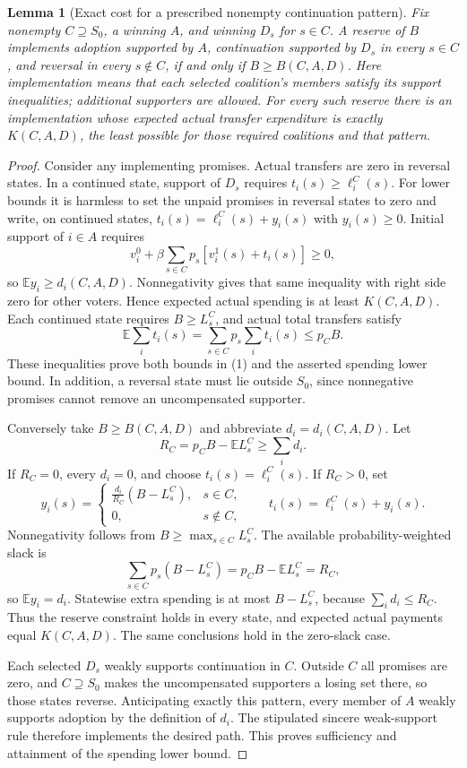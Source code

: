 \documentclass[11pt]{article}
\newtheorem{lemma}{Lemma}
\theoremstyle{definition}
\begin{document}
\begin{lemma}[Exact cost for a prescribed nonempty continuation pattern]
Fix nonempty $C\supseteq S_0$, a winning $A$, and winning $D_s$ for
$s\in C$. A reserve of $B$ implements adoption supported by $A$,
continuation supported by $D_s$ in every $s\in C$, and reversal in
every $s\notin C$, if and only if $B\geq B(C,A,D)$.
Here implementation means that each selected coalition's members
satisfy its support inequalities; additional supporters are allowed.
For every such reserve there is an implementation whose expected
actual transfer expenditure is exactly $K(C,A,D)$, the least possible
for those required coalitions and that pattern.
\end{lemma}
\begin{proof}
Consider any implementing promises. Actual transfers are zero in
reversal states. In a continued state, support of $D_s$ requires
$t_i(s)\geq\ell_i^C(s)$. For lower bounds it is harmless to set the
unpaid promises in reversal states to zero and write, on continued
states, $t_i(s)=\ell_i^C(s)+y_i(s)$ with $y_i(s)\geq0$.
Initial support of $i\in A$ requires
\[
 v_i^0+\beta\sum_{s\in C}p_s[v_i^1(s)+t_i(s)]\geq0,
\]
so $\mathbb E y_i\geq d_i(C,A,D)$. Nonnegativity gives that same
inequality with right side zero for other voters. Hence expected
actual spending is at least $K(C,A,D)$. Each continued state requires
$B\geq L_s^C$, and actual total transfers satisfy
\[
 \mathbb E\sum_i t_i(s)
 =\sum_{s\in C}p_s\sum_i t_i(s)\leq p_CB.
\]
These inequalities prove both bounds in (1) and the asserted spending
lower bound. In addition, a reversal state must lie outside $S_0$,
since nonnegative promises cannot remove an uncompensated supporter.

Conversely take $B\geq B(C,A,D)$ and abbreviate $d_i=d_i(C,A,D)$.
Let
\[
 R_C=p_CB-\mathbb E L_s^C\geq\sum_i d_i.
\]
If $R_C=0$, every $d_i=0$, and choose $t_i(s)=\ell_i^C(s)$.
If $R_C>0$, set
\[
 y_i(s)=\begin{cases}
 \displaystyle\frac{d_i}{R_C}(B-L_s^C),&s\in C,\\
 0,&s\notin C,
 \end{cases}
 \qquad t_i(s)=\ell_i^C(s)+y_i(s).                          \tag{2}
\]
Nonnegativity follows from $B\geq\max_{s\in C}L_s^C$.
The available probability-weighted slack is
\[
 \sum_{s\in C}p_s(B-L_s^C)=p_CB-\mathbb E L_s^C=R_C,
\]
so $\mathbb E y_i=d_i$. Statewise extra spending is at most
$B-L_s^C$, because $\sum_i d_i\leq R_C$. Thus the reserve constraint
holds in every state, and expected actual payments equal $K(C,A,D)$.
The same conclusions hold in the zero-slack case.

Each selected $D_s$ weakly supports continuation in $C$. Outside $C$
all promises are zero, and $C\supseteq S_0$ makes the uncompensated
supporters a losing set there, so those states reverse. Anticipating
exactly this pattern, every member of $A$ weakly supports adoption
by the definition of $d_i$. The stipulated sincere weak-support rule
therefore implements the desired path. This proves sufficiency and
attainment of the spending lower bound.
\end{proof}
\end{document}
